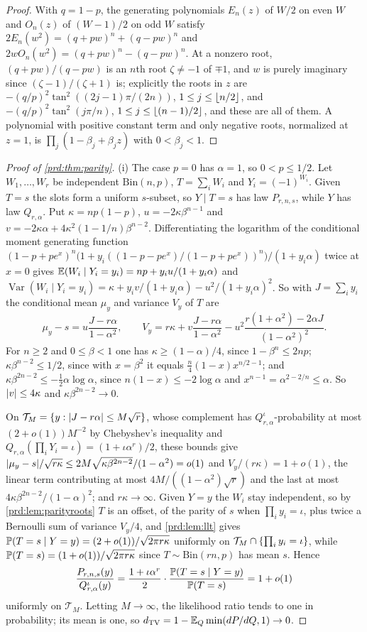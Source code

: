 \begin{proof}
With $q=1-p$, the generating polynomials $E_n(z)$ of $W/2$ on even $W$ and $O_n(z)$ of $(W-1)/2$ on odd $W$ satisfy
$2E_n(w^2)=(q+pw)^n+(q-pw)^n$ and $2wO_n(w^2)=(q+pw)^n-(q-pw)^n$. At a nonzero root, $(q+pw)/(q-pw)$ is an $n$th
root $\zeta\ne-1$ of $\mp1$, and $w$ is purely imaginary since $(\zeta-1)/(\zeta+1)$ is; explicitly the roots in $z$
are $-(q/p)^2\tan^2((2j-1)\pi/(2n))$, $1\le j\le\lfloor n/2\rfloor$, and $-(q/p)^2\tan^2(j\pi/n)$,
$1\le j\le\lfloor(n-1)/2\rfloor$, and these are all of them. A polynomial with positive constant term and only negative
roots, normalized at $z=1$, is $\prod_j(1-\beta_j+\beta_jz)$ with $0<\beta_j<1$.
\end{proof}

\begin{proof}[Proof of \cref{prd:thm:parity}]
(i) The case $p=0$ has $\alpha=1$, so $0<p\le1/2$. Let $W_1,\dots,W_r$ be independent $\mathrm{Bin}(n,p)$, $T=\sum_iW_i$
and $Y_i=(-1)^{W_i}$. Given $T=s$ the slots form a uniform $s$-subset, so $Y\mid T=s$ has law $P_{r,n,s}$, while $Y$
has law $Q_{r,\alpha}$. Put $\kappa=np(1-p)$, $u=-2\kappa\beta^{n-1}$ and
$v=-2\kappa\alpha+4\kappa^2(1-1/n)\beta^{n-2}$. Differentiating the logarithm of the conditional moment generating
function
$(1-p+pe^x)^n\bigl(1+y_i((1-p-pe^x)/(1-p+pe^x))^n\bigr)/(1+y_i\alpha)$ twice at $x=0$ gives
$\mathbb{E}(W_i\mid Y_i=y_i)=np+y_iu/(1+y_i\alpha)$ and
$\operatorname{Var}(W_i\mid Y_i=y_i)=\kappa+y_iv/(1+y_i\alpha)-u^2/(1+y_i\alpha)^2$. So with $J=\sum_iy_i$ the
conditional mean $\mu_y$ and variance $V_y$ of $T$ are
\[
 \mu_y-s=u\frac{J-r\alpha}{1-\alpha^2},\qquad
 V_y=r\kappa+v\frac{J-r\alpha}{1-\alpha^2}-u^2\frac{r(1+\alpha^2)-2\alpha J}{(1-\alpha^2)^2}.
\]
For $n\ge2$ and $0\le\beta<1$ one has $\kappa\ge(1-\alpha)/4$, since $1-\beta^n\le2np$; $\kappa\beta^{n-2}\le1/2$, since with
$x=\beta^2$ it equals $\frac n4(1-x)x^{n/2-1}$; and $\kappa\beta^{2n-2}\le-\frac12\alpha\log\alpha$, since
$n(1-x)\le-2\log\alpha$ and $x^{n-1}=\alpha^{2-2/n}\le\alpha$. So $\lvert v\rvert\le4\kappa$ and $\kappa\beta^{2n-2}\to0$.

On $\mathcal T_M=\{y:\lvert J-r\alpha\rvert\le M\sqrt r\}$, whose complement has $Q_{r,\alpha}^\iota$-probability at most
$(2+o(1))M^{-2}$ by Chebyshev's inequality and $Q_{r,\alpha}(\prod_iY_i=\iota)=(1+\iota\alpha^r)/2$, these bounds give
$\lvert\mu_y-s\rvert/\sqrt{r\kappa}\le2M\sqrt{\kappa\beta^{2n-2}}/(1-\alpha^2)=o(1)$ and $V_y/(r\kappa)=1+o(1)$, the linear
term contributing at most $4M/((1-\alpha^2)\sqrt r)$ and the last at most $4\kappa\beta^{2n-2}/(1-\alpha)^2$; and
$r\kappa\to\infty$. Given $Y=y$ the $W_i$ stay independent, so by \cref{prd:lem:parityroots} $T$ is an offset, of the
parity of $s$ when $\prod_iy_i=\iota$, plus twice a Bernoulli sum of variance $V_y/4$, and \cref{prd:lem:llt} gives
$\mathbb{P}(T=s\mid Y=y)=(2+o(1))/\sqrt{2\pi r\kappa}$ uniformly on $\mathcal T_M\cap\{\prod_iy_i=\iota\}$, while
$\mathbb{P}(T=s)=(1+o(1))/\sqrt{2\pi r\kappa}$ since $T\sim\mathrm{Bin}(rn,p)$ has mean $s$. Hence
\[
 \frac{P_{r,n,s}(y)}{Q_{r,\alpha}^\iota(y)}=\frac{1+\iota\alpha^r}2\cdot\frac{\mathbb{P}(T=s\mid Y=y)}{\mathbb{P}(T=s)}=1+o(1)
\]
uniformly on $\mathcal T_M$. Letting $M\to\infty$, the likelihood ratio tends to one in probability; its mean is one,
so $d_{\mathrm{TV}}=1-\mathbb{E}_Q\min(dP/dQ,1)\to0$.


\end{proof}
